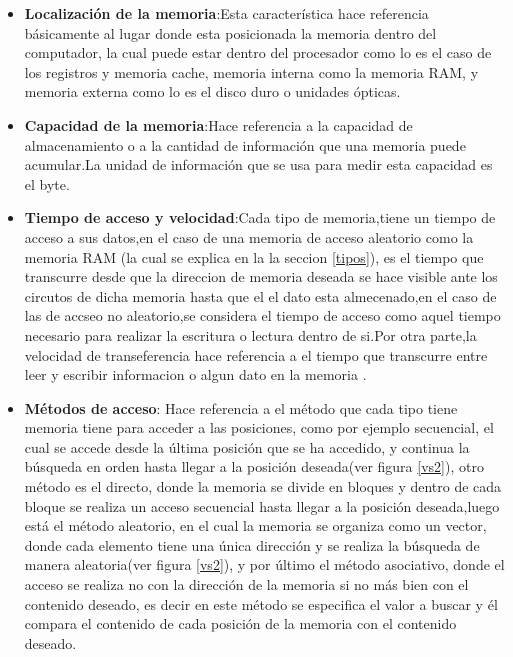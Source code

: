 \documentclass{article}
\begin{document}
\begin{itemize}
    \item \textbf{Localización de la memoria}:Esta característica hace referencia básicamente al lugar donde esta posicionada la memoria dentro del computador, la cual puede estar dentro del procesador como lo es el caso de los registros y memoria cache, memoria interna como la memoria RAM, y memoria externa como lo es el disco duro o unidades ópticas.
        
    \item \textbf{Capacidad de la memoria}:Hace referencia a la capacidad de almacenamiento o a la cantidad de información que una memoria puede acumular.La unidad de información que se usa para medir esta capacidad es el byte.\cite{arquitectura}
    
    \item \textbf{Tiempo de acceso y velocidad}:Cada tipo de memoria,tiene un tiempo de acceso a sus datos,en el caso de una memoria de acceso aleatorio como la memoria RAM (la cual se explica en la la seccion \ref{tipos}), es el tiempo que transcurre desde que la direccion de memoria deseada se hace visible ante los circutos de dicha memoria hasta que el el dato esta almecenado,en el caso de las de accseo no aleatorio,se considera el tiempo de acceso como aquel tiempo necesario para realizar la escritura o lectura dentro de si.Por otra parte,la velocidad de transeferencia hace referencia a el tiempo que transcurre entre leer y escribir informacion o algun dato en la memoria \cite{arquitectura}.
    
    \item \textbf {Métodos de acceso}: Hace referencia a el método que cada tipo tiene memoria tiene para acceder a las posiciones, como por ejemplo secuencial, el cual se accede desde la última posición que se ha accedido, y continua la búsqueda en orden hasta llegar a la posición deseada(ver figura \ref{vs2}), otro método es el directo, donde la memoria se divide en bloques y dentro de cada bloque se realiza un acceso secuencial hasta llegar a la posición deseada,luego está el método aleatorio, en el cual la memoria se organiza como un vector, donde cada elemento tiene una única dirección y se realiza la búsqueda de manera aleatoria(ver figura \ref{vs2}), y por último el método asociativo, donde el acceso se realiza no con la dirección de la memoria si no más bien con el contenido deseado, es decir en este método se especifica el valor a buscar y él compara el contenido de cada posición de la memoria con el contenido deseado.\cite{arquitectura}\\
    

\end{itemize}
\end{document}

